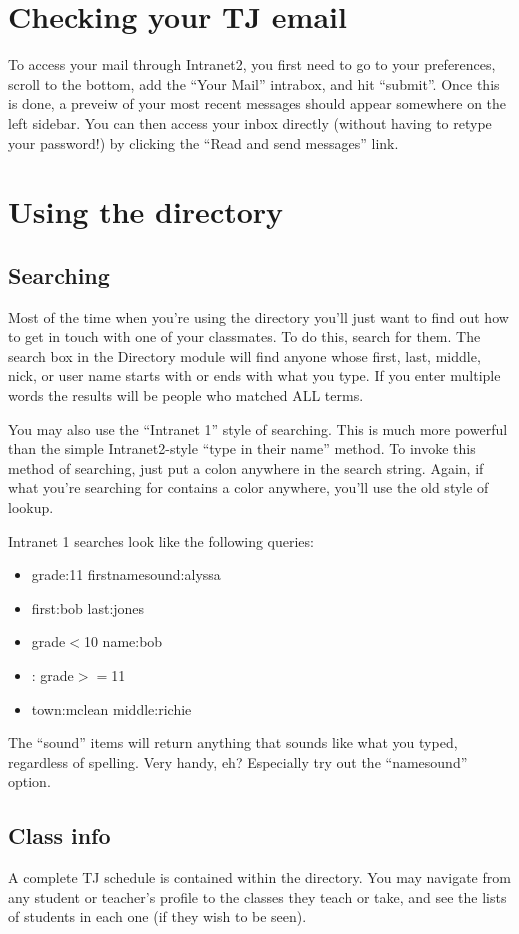 \documentclass[11pt,letterpaper]{report}
\begin{document}
\section{Checking your TJ email}
To access your mail through Intranet2, you first need to go to your preferences, scroll to the bottom, add the ``Your Mail''
intrabox, and hit ``submit''. Once this is done, a preveiw of your most recent messages should appear somewhere on the left sidebar.
You can then access your inbox directly (without having to retype your password!) by clicking the ``Read and send messages'' link.
\section{Using the directory}
\subsection{Searching}
Most of the time when you're using the directory you'll just want to find out 
how to get in touch with one of your classmates.  To do this, search for them.
The search box in the Directory module will find anyone whose first, last, middle,
nick, or user name starts with or ends with what you type.  If you enter multiple
words the results will be people who matched ALL terms.

You may also use the ``Intranet 1'' style of searching.  This is much more powerful
than the simple Intranet2-style ``type in their name'' method.  To invoke this method
of searching, just put a colon anywhere in the search string.  Again, if what you're
searching for contains a color anywhere, you'll use the old style of lookup.

Intranet 1 searches look like the following queries:
\begin{itemize}
	\item grade:11 firstnamesound:alyssa
	\item first:bob last:jones
	\item grade$<$10 name:bob
	\item : grade$>=$11
	\item town:mclean middle:richie
\end{itemize}
The ``sound'' items will return anything that sounds like what you typed, 
regardless of spelling.  Very handy, eh? Especially try out the ``namesound'' 
option.
\subsection{Class info}
A complete TJ schedule is contained within the directory.  You may navigate
from any student or teacher's profile to the classes they teach or take,
and see the lists of students in each one (if they wish to be seen).
\end{document}
